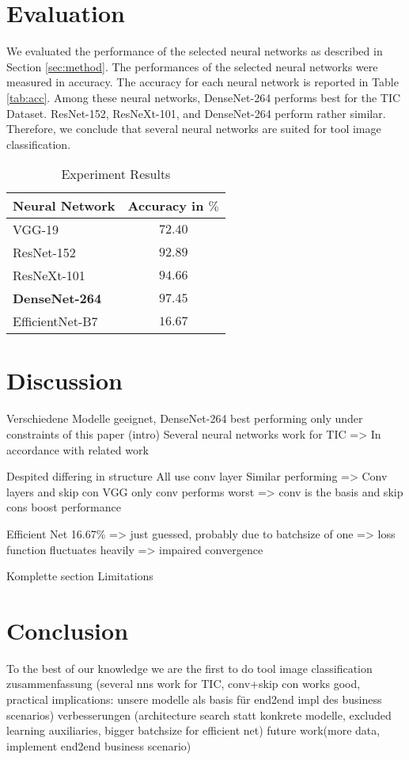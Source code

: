 \documentclass[a4paper, 10pt, journal]{wissarbIEEE}
\begin{document}
\section{Evaluation}
We evaluated the performance of the selected neural networks as described in Section \ref{sec:method}. The performances of the selected neural networks were measured in accuracy. The accuracy for each neural network is reported in Table \ref{tab:acc}. 
Among these neural networks, DenseNet-264 performs best for the {TIC Dataset}. ResNet-152, ResNeXt-101, and DenseNet-264 perform rather similar. Therefore, we conclude that several neural networks are suited for tool image classification.
\begin{table}[h]
\caption{Experiment Results} \label{tab:acc}
	\begin{tabularx}{0.48\textwidth}{Xc}
		\toprule 
		\textbf{Neural Network} & \textbf{Accuracy in $\%$} \\\midrule
		VGG-19 & $72.40$ \\
		ResNet-152 & $92.89$ \\
		ResNeXt-101 & $94.66$ \\
		\textbf{DenseNet-264} & $\mathbf{97.45}$ \\
		EfficientNet-B7 & $16.67$\\
		\bottomrule
	\end{tabularx}  \label{tab:initmodel}
\end{table}

\section{Discussion}
Verschiedene Modelle geeignet, 
DenseNet-264 best performing only under constraints of this paper (intro)
Several neural networks work for TIC => In accordance with related work

Despited differing in structure All use conv layer
Similar performing => Conv layers and skip con
VGG only conv performs worst => conv is the basis and skip cons boost performance

Efficient Net 16.67\% => just guessed, probably due to batchsize of one => loss function fluctuates heavily => impaired convergence

Komplette section Limitations

\section{Conclusion}
To the best of our knowledge we are the first to do tool image classification
zusammenfassung (several nns work for TIC, conv+skip con works good, practical implications: unsere modelle als basis für end2end impl des business scenarios)
verbesserungen (architecture search statt konkrete modelle, excluded learning auxiliaries, bigger batchsize for efficient net)
future work(more data, implement end2end business scenario)


\end{document}

